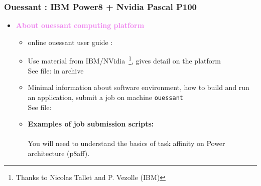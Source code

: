 \begin{frame}
  \frametitle{Ouessant : IBM Power8 + Nvidia Pascal P100}
  
  \begin{itemize}
  \item {\bf \textcolor{violet}{\large About ouessant computing platform}}
    \begin{itemize}
    \item online ouessant user guide : 
    \item Use material from IBM/NVidia~\footnote{Thanks to Nicolas Tallet and P. Vezolle (IBM)}, gives detail on the platform\\
      See file:  in archive
    \item Minimal information about software environment, how to build and run an application, submit a job on machine \texttt{ouessant}\\
      See file: 
    \item {\bf Examples of job submission scripts:}\\
      \\
      You will need to understand the basics of task affinity on Power architecture (p8aff).\\
    \end{itemize}
  \end{itemize}
\end{frame}

